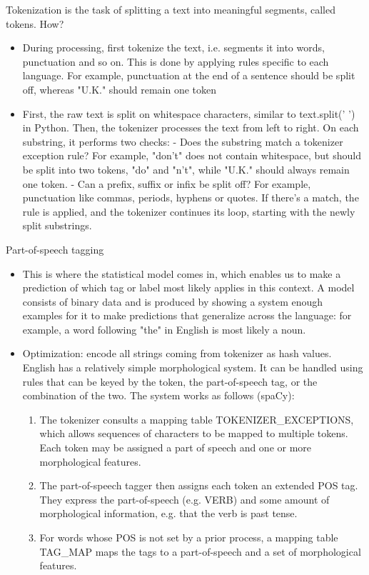 \documentclass[a4paper,10pt]{article}
\begin{document}
  Tokenization is the task of splitting a text into meaningful segments, called tokens.
  How? \newline
  \begin{itemize}
  \item During processing, first tokenize the text, i.e. segments it into words, punctuation and so on. This is done by applying rules specific to each language. For example, punctuation at the end of a sentence should be split off, whereas "U.K." should remain one token
  \item First, the raw text is split on whitespace characters, similar to text.split(' ') in Python. Then, the tokenizer processes the text from left to right. On each substring, it performs two checks:
  - Does the substring match a tokenizer exception rule? For example, "don't" does not contain whitespace, but should be split into two tokens, "do" and "n't", while "U.K." should always remain one token.
  - Can a prefix, suffix or infix be split off? For example, punctuation like commas, periods, hyphens or quotes.
  If there's a match, the rule is applied, and the tokenizer continues its loop, starting with the newly split substrings. \newline
 \end{itemize}
  Part-of-speech tagging \newline
  \begin{itemize}
  \item This is where the statistical model comes in, which enables us to make a prediction of which tag or label most likely applies in this context. A model consists of binary data and is produced by showing a system enough examples for it to make predictions that generalize across the language: for example, a word following "the" in English is most likely a noun.
  \item Optimization: encode all strings coming from tokenizer as hash values.
  English has a relatively simple morphological system. It can be handled using rules that can be keyed by the token, the part-of-speech tag, or the combination of the two. The system works as follows (spaCy): \newline
   \begin{enumerate}
  \item  The tokenizer consults a mapping table TOKENIZER\_EXCEPTIONS, which allows sequences of characters to be mapped to multiple tokens. Each token may be assigned a part of speech and one or more morphological features.
  \item  The part-of-speech tagger then assigns each token an extended POS tag. They express the part-of-speech (e.g. VERB) and some amount of morphological information, e.g. that the verb is past tense.
  \item  For words whose POS is not set by a prior process, a mapping table TAG\_MAP maps the tags to a part-of-speech and a set of morphological features.
  \end{enumerate}
  \end{itemize}
  
\end{document}
